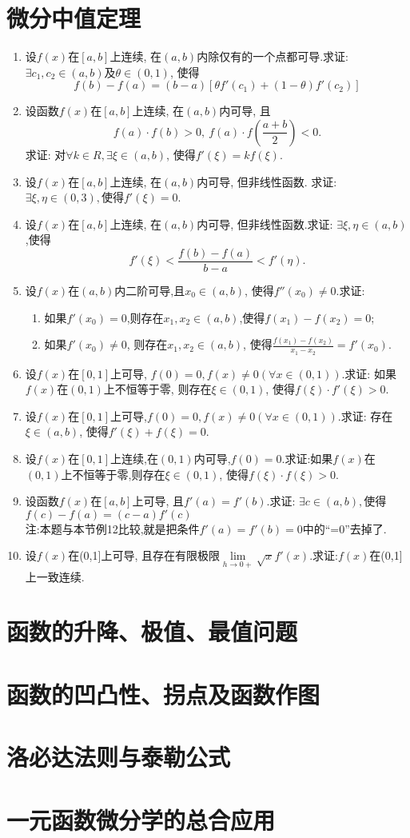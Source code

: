 \section{微分中值定理}
\begin{enumerate}
	\item 设$f(x)$在$[a,b]$上连续, 在$(a,b)$内除仅有的一个点都可导.求证: $\exists c_1,c_2\in(a,b)$及$\theta \in (0,1)$, 使得
	$$f(b)-f(a)=(b-a)[\theta f'(c_1)+(1-\theta)f'(c_2)]
	$$
	\item 设函数$f(x)$在$[a,b]$上连续, 在$(a,b)$内可导, 且$$
	f(a)\cdot f(b) > 0,\ f(a)\cdot f(\frac{a+b}{2})<0.$$
	求证: 对$\forall k\in R, \exists \xi\in (a,b)$, 使得$f'(\xi)=kf(\xi)$.
	\item 设$f(x)$在$[a,b]$上连续, 在$(a,b)$内可导, 但非线性函数. 求证: 
	$\exists \xi,\eta\in(0,3), $使得$f'(\xi)=0$.
	\item 设$f(x)$在$[a,b]$上连续, 在$(a,b)$内可导, 但非线性函数.求证: $\exists \xi,\eta\in (a,b)$,使得$$
	f'(\xi)<\frac{f(b)-f(a)}{b-a}<f'(\eta).$$
	\item 设$f(x)$在$(a,b)$内二阶可导,且$x_0\in (a,b)$, 使得$f''(x_0)\ne 0$.求证:
	\begin{enumerate}
		\item 如果$f'(x_0)=0$,则存在$x_1,x_2\in (a,b)$,使得${f(x_1)-f(x_2)}=0$;
		\item 如果$f'(x_0)\ne 0$, 则存在$x_1,x_2\in (a,b)$, 使得$\frac{f(x_1)-f(x_2)}{x_1-x_2}=f'(x_0)$.
	\end{enumerate}
	\item 设$f(x)$在$[0,1]$上可导, $f(0)=0, f(x)\ne 0(\forall x\in(0,1))$.求证: 如果$f(x)$在$(0,1)$上不恒等于零, 则存在$\xi \in (0,1)$, 使得$f(\xi)\cdot f'(\xi)>0$.
	\item 设$f(x)$在$[0,1]$上可导,$f(0)=0,f(x)\ne 0(\forall x\in (0,1))$.求证:
	存在$\xi\in(a,b)$, 使得$f'(\xi)+f(\xi)=0$.
	\item 设$f(x)$在$[0,1]$上连续,在$(0,1)$内可导,$f(0)=0$.求证:如果$f(x)$在$(0,1)$上不恒等于零,则存在$\xi \in (0,1)$, 使得$f(\xi)\cdot f(\xi)>0$.
	\item 设函数$f(x)$在$[a,b]$上可导, 且$f'(a)=f'(b)$.求证: $\exists c\in (a,b), $使得$f(c)-f(a)=(c-a)f'(c)$ \\
	注:\quad 本题与本节例12比较,就是把条件$f'(a)=f'(b)=0$中的“=0”去掉了.
	\item 设$f(x)$在(0,1]上可导, 且存在有限极限$\lim\limits_{h\rightarrow 0+}\sqrt{x}f'(x)$.求证:$f(x)$在(0,1]上一致连续.
\end{enumerate}

\section{函数的升降、极值、最值问题}


\section{函数的凹凸性、拐点及函数作图}

\section{洛必达法则与泰勒公式}

\section{一元函数微分学的总合应用}